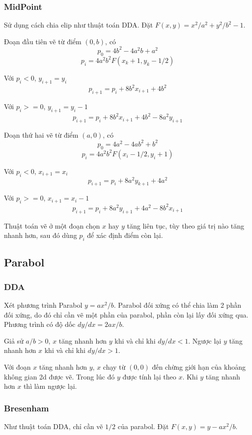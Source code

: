 \documentclass[12pt]{article}
\begin{document}
\subsubsection{MidPoint}
Sử dụng cách chia elip như thuật toán DDA.
Đặt \(F(x, y) = x^2/a^2 + y^2/b^2 - 1\).

Đoạn đầu tiên vẽ từ điểm \((0, b)\), có
\[p_0 = 4b^2 - 4a^2 b + a^2\]
\[p_i = 4a^2 b^2 F(x_k + 1, y_k - 1/2)\]

Với \(p_i < 0\), \(y_{i+1} = y_i\)
\[p_{i+1} = p_i + 8b^2 x_{i+1} + 4b^2\]

Với \(p_i >= 0\), \(y_{i+1} = y_i - 1\)
\[p_{i+1} = p_i + 8b^2 x_{i+1} + 4b^2 - 8a^2 y_{i+1}\]

Đoạn thứ hai vẽ từ điểm \((a, 0)\), có
\[p_0 = 4a^2 - 4a b^2 + b^2\]
\[p_i = 4a^2 b^2 F(x_i - 1/2, y_i + 1)\]

Với \(p_i < 0\), \(x_{i+1} = x_i\)
\[p_{i+1} = p_i + 8a^2 y_{k+1} + 4a^2\]

Với \(p_i >= 0\), \(x_{i+1} = x_i - 1\)
\[p_{i+1} = p_i + 8a^2 y_{i+1} + 4a^2 - 8b^2 x_{i+1}\]

Thuật toán vẽ ở một đoạn chọn \(x\) hay \(y\) tăng liên tục,
tùy theo giá trị nào tăng nhanh hơn,
sau đó dùng \(p_i\) để xác định điểm còn lại.

\subsection{Parabol}

\subsubsection{DDA}
Xét phương trình Parabol \(y = ax^2/b\).
Parabol đối xứng có thể chia làm 2 phần đối xứng,
do đó chỉ cần vẽ một phần của parabol, phần còn lại lấy đối xứng qua.
Phương trình có độ dốc \(dy/dx = 2ax/b\).

Giả sử \(a/b > 0\), \(x\) tăng nhanh hơn \(y\) khi và chỉ khi \(dy/dx < 1\).
Ngược lại \(y\) tăng nhanh hơn \(x\) khi và chỉ khi \(dy/dx > 1\).

Với đoạn \(x\) tăng nhanh hơn \(y\), \(x\) chạy từ \((0, 0)\) đến chừng giới hạn của khoảng không gian 2d được vẽ.
Trong lúc đó \(y\) được tính lại theo \(x\). Khi \(y\) tăng nhanh hơn \(x\) thì làm ngược lại.

\subsubsection{Bresenham}
Như thuật toán DDA, chỉ cần vẽ \(1/2\) của parabol.
Đặt \(F(x, y) = y - ax^2/b\).
\end{document}
